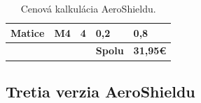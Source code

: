 \begin{table}
\begin{tabular}{p{} p{} p{} p{} p{}}
		Matice                              & M4                                                 & 4                                  & 0,2                                      & 0,8                                        \\ \hline
		\multicolumn{1}{|l}{}               &                                                    & \multicolumn{1}{l}{}               & \textbf{Spolu}                           & \multicolumn{1}{c|}{\textbf{31,95\euro}}        \\ \hline
	\end{tabular}
\caption{Cenová kalkulácia AeroShieldu.}
\label{Cenova kalkulacia}
\end{table}

\subsection{Tretia verzia AeroShieldu}